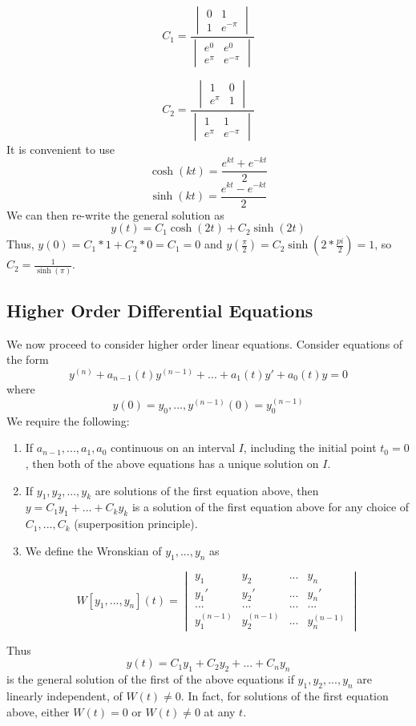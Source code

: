 \documentclass[11pt]{article}
\theoremstyle{plain} %
\theoremstyle{definition}
\theoremstyle{example}
\theoremstyle{remark}
\begin{document}
$$C_1 = \frac{\begin{vmatrix}0 & 1\\ 1 & e^{-\pi}\end{vmatrix}}{\begin{vmatrix} e^0 & e^0 \\ e^{\pi} & e^{-\pi}\end{vmatrix}}$$

$$C_2 = \frac{\begin{vmatrix}1 & 0\\  e^{\pi} & 1\end{vmatrix}}{\begin{vmatrix} 1 & 1 \\ e^{\pi} & e^{-\pi}\end{vmatrix}}$$
It is convenient to use 
$$\cosh (kt) = \frac{e^{kt} + e^{-kt}}{2}$$
$$\sinh(kt) =  \frac{e^{kt} -e^{-kt}}{2}$$
We can then re-write the general solution as 
$$y(t) = C_1\cosh(2t) + C_2\sinh(2t)$$
Thus, $y(0) = C_1*1 + C_2*0 = C_1 = 0$ and $y\left(\frac{\pi}{2}\right) = C_2\sinh\left(2*\frac{pi}{2}\right) = 1$, so $C_2 = \frac{1}{\sinh(\pi)}$. 


\subsection{Higher Order Differential Equations}
We now proceed to consider higher order linear equations. Consider equations of the form 
$$y^{(n)}  + a_{n-1}(t)y^{(n-1)} + ... + a_1(t)y' + a_0(t)y = 0$$
where $$y(0) = y_0, ..., y^{(n-1)}(0) = y_0^{(n-1)}$$ We require the following:

\begin{enumerate}
	\item If $a_{n-1}, ..., a_1, a_0$ continuous on an interval $I$, including the initial point $t_0 = 0$, then both of the above equations has a unique solution on $I$.
	\item If $y_1, y_2, ..., y_k$ are solutions of the first equation above, then $y = C_1y_1 + ... + C_k y_k$ is a solution of the first equation above for any choice of $C_1, ..., C_k$ (superposition principle). 
	\item We define the Wronskian of $y_1, ..., y_n$ as 
	
	$$W[y_1, ..., y_n](t) = \begin{vmatrix}y_1 & y_2 & ... & y_n\\
	y_1' & y_2' & ... & y_n' \\
	... & ... & ... & ... \\
	y_1^{(n-1)} & y_2^{(n-1)} & ... & y_n^{(n-1)}
	\end{vmatrix}$$
\end{enumerate}
Thus $$y(t) = C_1y_1 + C_2y_2 + ... +C_ny_n$$ is the general solution of the first of the above equations if $y_1, y_2, ..., y_n$ are linearly independent, of $W(t) \neq 0$. In fact, for solutions of the first equation above, either $W(t) = 0$ or $W(t) \neq 0$ at any $t$. 
\end{document}

